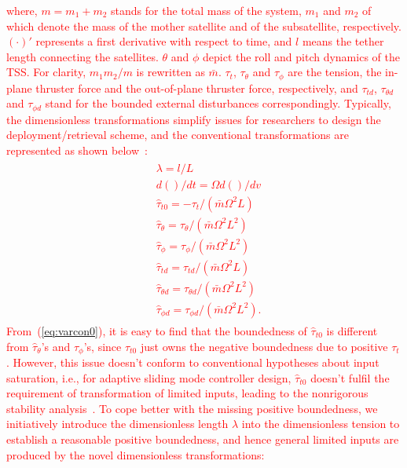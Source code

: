 \documentclass[3p]{elsarticle}
\theoremstyle{plain}
\theoremstyle{remark}
\begin{document}
\textcolor{red}{where, $m = m_1+m_2$ stands for the total mass of the system, $m_1$ and $m_2$ of which denote the mass of the mother satellite and of the subsatellite, respectively. \textcolor{red}{$(\cdot)'$ represents a first derivative with respect to time, and $l$ means the tether length connecting the satellites. $\theta$ and $\phi$ depict the roll and pitch dynamics of the TSS. For clarity, $m_1m_2/m$ is rewritten as $\bar m$. $\tau_t$, $\tau_\theta$ and $\tau_\phi$ are the tension, the in-plane thruster force and the out-of-plane thruster force, respectively, and $\tau_{t d}$, $\tau_{\theta d}$ and $\tau_{\phi d}$ stand for the bounded external disturbances correspondingly.} Typically, the dimensionless transformations simplify issues for researchers to design the deployment/retrieval scheme, and the conventional transformations are represented as shown below~\cite{williams2009yes2,wen2015space,wen2016constrained}:
\begin{align}
\begin{split}
&\lambda=l/L\\
&d()/dt=\Omega d()/dv\\
&\hat{\tau}_{t0}=-\tau_t/(\bar{m}\Omega^2L)\\
&\hat{\tau}_\theta=\tau_\theta/(\bar{m}\Omega^2L^2)\\
&\hat{\tau}_\phi = \tau_\phi/(\bar{m}\Omega^2L^2)\\
&\hat{\tau}_{td}=\tau_{td}/(\bar{m}\Omega^2L)\\
&\hat{\tau}_{\theta d}=\tau_{\theta d}/(\bar{m}\Omega^2L^2)\\
&\hat{\tau}_{\phi d}= \tau_{\phi d}/(\bar{m}\Omega^2L^2)\label{eq:varcon0}.
\end{split}
\end{align}
From~(\ref{eq:varcon0}), it is easy to find that the boundedness of $\hat{\tau}_{t0}$ is different from $\hat{\tau}_\theta$'s and $\hat{\tau}_\phi$'s, since $\hat{\tau}_{t0}$ just owns the negative boundedness due to positive $\tau_t$. However, this issue doesn't conform to conventional hypotheses about input saturation, i.e., for adaptive sliding mode controller design, $\hat{\tau}_{t0}$ doesn't fulfil the requirement of transformation of limited inputs, leading to the nonrigorous stability analysis~\cite{Hu2008552,6060930}. To cope better with the missing positive boundedness, we initiatively introduce the dimensionless length $\lambda$ into the dimensionless tension to establish a reasonable positive boundedness, and hence general limited inputs are produced by the novel dimensionless transformations:
}
\end{document}

